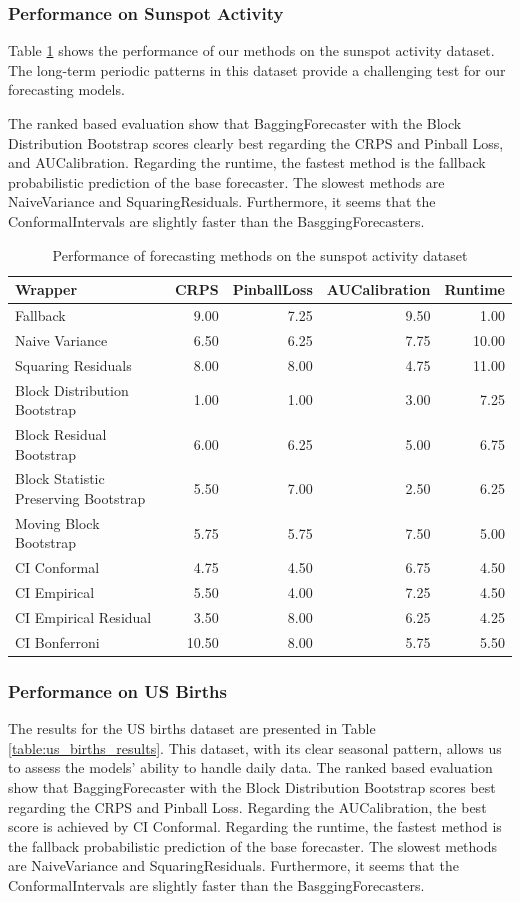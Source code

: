 \subsubsection{Performance on Sunspot Activity}
Table \ref{table:sunspot_results} shows the performance of our methods on the sunspot activity dataset. The long-term periodic patterns in this dataset provide a challenging test for our forecasting models.

The ranked based evaluation show that BaggingForecaster with the Block Distribution Bootstrap scores clearly best regarding the CRPS and Pinball Loss, and AUCalibration. Regarding the runtime, the fastest method is the fallback probabilistic prediction of the base forecaster. The slowest methods are NaiveVariance and SquaringResiduals. 
Furthermore, it seems that the ConformalIntervals are slightly faster than the BasggingForecasters. 
\begin{table}[h]
    \centering
    \caption{Performance of forecasting methods on the sunspot activity dataset}
    \label{table:sunspot_results}
\begin{tabular}{lrrrr}
\toprule
Wrapper & CRPS & PinballLoss & AUCalibration & Runtime \\
\midrule
Fallback & 9.00 & 7.25 & 9.50 & 1.00 \\
Naive Variance & 6.50 & 6.25 & 7.75 & 10.00 \\
Squaring Residuals & 8.00 & 8.00 & 4.75 & 11.00 \\
Block Distribution Bootstrap & 1.00 & 1.00 & 3.00 & 7.25 \\
Block Residual Bootstrap & 6.00 & 6.25 & 5.00 & 6.75 \\
Block Statistic Preserving Bootstrap & 5.50 & 7.00 & 2.50 & 6.25 \\
Moving Block Bootstrap & 5.75 & 5.75 & 7.50 & 5.00 \\
CI Conformal & 4.75 & 4.50 & 6.75 & 4.50 \\
CI Empirical & 5.50 & 4.00 & 7.25 & 4.50 \\
CI Empirical Residual & 3.50 & 8.00 & 6.25 & 4.25 \\
CI Bonferroni  & 10.50 & 8.00 & 5.75 & 5.50 \\
\bottomrule
\end{tabular}


\end{table}

\subsubsection{Performance on US Births}
The results for the US births dataset are presented in Table \ref{table:us_births_results}. This dataset, with its clear seasonal pattern, allows us to assess the models' ability to handle daily data.
The ranked based evaluation show that BaggingForecaster with the Block Distribution Bootstrap scores best regarding the CRPS and Pinball Loss. 
Regarding the AUCalibration, the best score is achieved by CI Conformal. Regarding the runtime, the fastest method is the fallback probabilistic prediction of the base forecaster. The slowest methods are NaiveVariance and SquaringResiduals. Furthermore, it seems that the ConformalIntervals are slightly faster than the BasggingForecasters. 


